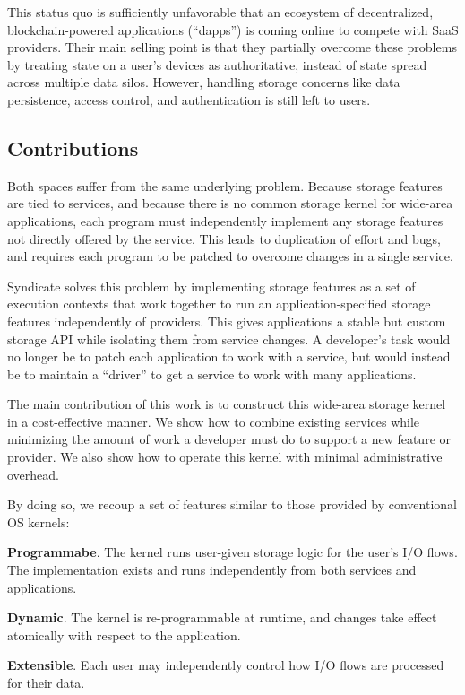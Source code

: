 This status quo is sufficiently unfavorable that an ecosystem of decentralized,
blockchain-powered applications (``dapps'') is coming online to compete with SaaS
providers. Their main selling point is that they partially overcome these
problems by treating state on a user's devices as authoritative, instead of
state spread across multiple data silos. However, handling storage concerns
like data persistence, access control, and authentication is still left to
users.

\subsection{Contributions}

Both spaces suffer from the same underlying problem. Because storage features
are tied to services, and because there is no common storage kernel for
wide-area applications, each program must independently implement any storage
features not directly offered by the service.  This leads to duplication of
effort and bugs, and requires each program to be patched to overcome changes in
a single service.

Syndicate solves this problem by implementing
storage features as a set of execution contexts that work together to run an 
application-specified storage features independently of providers.  This gives
applications a stable but
custom storage API while isolating them from service changes.  A
developer's task would no longer be to patch each application to work with a
service, but would instead be to maintain a ``driver'' to get a service to
work with many applications.

The main contribution of this work is to construct this
wide-area storage kernel in a cost-effective manner.  We show how to
combine existing services while minimizing the amount of work
a developer must do to support a new feature or provider.  We also show
how to operate this kernel with minimal administrative overhead.

By doing so, we recoup a set of features similar to those provided by
conventional OS kernels:

\textbf{Programmabe}. The kernel runs user-given storage logic for the user's
I/O flows.  The implementation exists and runs independently from both
services and applications.

\textbf{Dynamic}. The kernel is re-programmable at
runtime, and changes take effect atomically with respect to the application.

\textbf{Extensible}.  Each user may independently control how I/O flows are
processed for their data.

